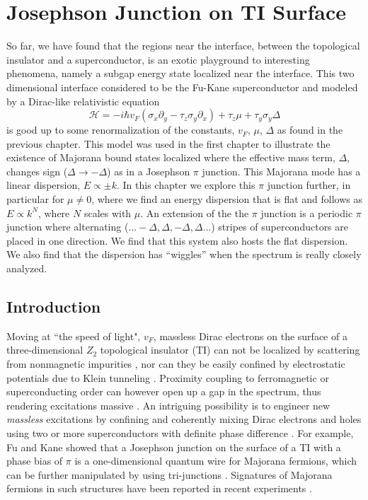 
\chapter{Josephson Junction on TI Surface}

So far, we have found that the regions near the interface, between the topological insulator and a superconductor, is an exotic playground to interesting phenomena, namely a subgap energy state localized near the interface. This two dimensional interface considered to be the Fu-Kane superconductor and modeled by a Dirac-like relativistic equation
\begin{equation}
\mathcal{H}=-i\hbar v_F(\sigma_x  \partial_y - \tau_z\sigma_y \partial_x) + \tau_z \mu + \tau_y \sigma_y \Delta
\end{equation}
is good up to some renormalization of the constants, $v_F$, $\mu$, $\Delta$ as found in the previous chapter. This model was used in the first chapter to illustrate the existence of Majorana bound states localized where the effective mass term, $\Delta$, changes sign ($\Delta\rightarrow -\Delta$) as in a Josephson $\pi$ junction. This Majorana mode has a linear dispersion, $E\propto \pm k$.
In this chapter we explore this $\pi$ junction further, in particular for $\mu \neq 0$, where we find an energy dispersion that is flat and follows as $E \propto k^{N}$, where $N$ scales with $\mu$.
An extension of the the $\pi$ junction is a periodic $\pi$ junction where alternating ($...-\Delta,\Delta,-\Delta,\Delta...$) stripes of superconductors are placed in one direction. We find that this system also hosts the flat dispersion. We also find that the dispersion has ``wiggles'' when the spectrum is really closely analyzed. 

\section{Introduction}

Moving at ``the speed of light", $v_F$,
massless Dirac electrons on the surface of a three-dimensional $Z_2$ topological insulator (TI) can not be localized by scattering from nonmagnetic impurities \cite{hasan_colloquium:_2010,qi_topological_2011}, nor can they be
easily confined by electrostatic potentials due to Klein tunneling \cite{Katsnelson:2006fk}. Proximity coupling to 
ferromagnetic or superconducting order can however 
open up a gap in the spectrum, thus rendering excitations massive \cite{hasan_colloquium:_2010,qi_topological_2011}.
 An intriguing
possibility is to engineer new {\it massless} excitations by confining and coherently mixing Dirac electrons 
and holes using two or more superconductors with definite phase difference \cite{fu_superconducting_2008}.
For example, Fu and Kane showed that a Josephson junction on the surface of a TI with a phase bias of $\pi$ is a one-dimensional quantum wire for Majorana fermions, 
which can be further manipulated by using tri-junctions \cite{fu_superconducting_2008}. Signatures of Majorana fermions in such structures have been reported in recent 
experiments \cite{williams_unconventional_2012,moore_extraordinary_2012}.

